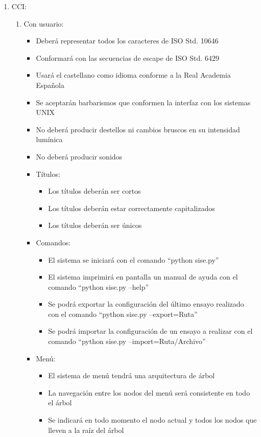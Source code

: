 \documentclass[
11pt, %
]{charter}
\begin{document}
\begin{enumerate}
	\item CCI:
	\begin{enumerate}
		\item Con usuario:
		\begin{itemize}
			\item Deberá representar todos los caracteres de ISO Std. 10646
			\item Conformará con las secuencias de escape de ISO Std. 6429
			\item Usará el castellano como idioma conforme a la Real Academia Española
			\item Se aceptarán barbarismos que conformen la interfaz con los sistemas UNIX
			\item No deberá producir destellos ni cambios bruscos en su intensidad lumínica
			\item No deberá producir sonidos
			\item Títulos:
			\begin{itemize}
				\item Los títulos deberán ser cortos
				\item Los títulos deberán estar correctamente capitalizados
				\item Los títulos deberán ser únicos
			\end{itemize}
			\item Comandos:
			\begin{itemize}
				\item El sistema se iniciará con el comando ``python sise.py''
				\item El sistema imprimirá en pantalla un manual de ayuda con el comando ``python sise.py --help''
				\item Se podrá exportar la configuración del último ensayo realizado con el comando ``python sise.py --export=Ruta''
				\item Se podrá importar la configuración de un ensayo a realizar con el comando ``python sise.py --import=Ruta/Archivo''
			\end{itemize}
			\item Menú:
			\begin{itemize}
				\item El sistema de menú tendrá una arquitectura de árbol
				\item La navegación entre los nodos del menú será consistente en todo el árbol
				\item Se indicará en todo momento el nodo actual y todos los nodos que lleven a la raíz del árbol

\end{itemize}
\end{itemize}
\end{enumerate}
\end{enumerate}
\end{document}
